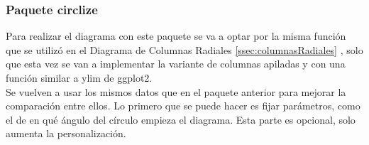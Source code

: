 \documentclass{article}\usepackage[]{graphicx}\usepackage[]{color}
\begin{document}
\subsubsection{Paquete circlize}
Para realizar el diagrama con este paquete \cite{docu_circlize}
se va a optar por la misma funci\'on que se utiliz\'o en el Diagrama de Columnas Radiales \autoref{ssec:columnasRadiales}
, solo que esta vez se van a implementar la variante de columnas apiladas y con una funci\'on similar a ylim de ggplot2.~\\
Se vuelven a usar los mismos datos que en el paquete anterior para mejorar la comparaci\'on entre ellos. Lo primero que se puede hacer es fijar par\'ametros, como el de en qu\'e \'angulo del c\'irculo empieza el diagrama. Esta parte es opcional, solo aumenta la personalizaci\'on. 
\end{document}
